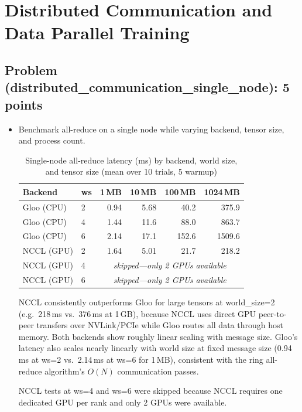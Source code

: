 \documentclass[letterpaper]{article}
\begin{document}
	\section{Distributed Communication and Data Parallel Training}
	
	\subsection{Problem (distributed\_communication\_single\_node): 5 points}
	
	\begin{itemize}
		\item[(a)] Benchmark all-reduce on a single node while varying backend, tensor size, and process count.
		
		\begin{table}[H]
			\centering
			\caption{Single-node all-reduce latency (ms) by backend, world size, and tensor size (mean over 10 trials, 5 warmup)}
			\label{tab:allreduce}
			\begin{tabular}{llrrrr}
				\hline
				Backend & ws & 1\,MB & 10\,MB & 100\,MB & 1024\,MB \\
				\hline
				Gloo (CPU) & 2 & 0.94 & 5.68  &  40.2  &  375.9  \\
				Gloo (CPU) & 4 & 1.44 & 11.6  &  88.0  &  863.7  \\
				Gloo (CPU) & 6 & 2.14 & 17.1  & 152.6  & 1509.6  \\
				NCCL (GPU) & 2 & 1.64 &  5.01 &  21.7  &  218.2  \\
				NCCL (GPU) & 4 & \multicolumn{4}{c}{\emph{skipped---only 2 GPUs available}} \\
				NCCL (GPU) & 6 & \multicolumn{4}{c}{\emph{skipped---only 2 GPUs available}} \\
				\hline
			\end{tabular}
		\end{table}
		
		NCCL consistently outperforms Gloo for large tensors at world\_size=2 (e.g.\ 218\,ms vs.\ 376\,ms at 1\,GB), because NCCL uses direct GPU peer-to-peer transfers over NVLink/PCIe while Gloo routes all data through host memory. Both backends show roughly linear scaling with message size. Gloo's latency also scales nearly linearly with world size at fixed message size (0.94\,ms at ws=2 vs.\ 2.14\,ms at ws=6 for 1\,MB), consistent with the ring all-reduce algorithm's $O(N)$ communication passes. 
		
		NCCL tests at ws=4 and ws=6 were skipped because NCCL requires one dedicated GPU per rank and only 2 GPUs were available.
	\end{itemize}
	
\end{document}
